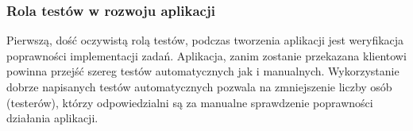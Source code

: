 \subsubsection{Rola testów w rozwoju aplikacji}
Pierwszą, dość oczywistą rolą testów, podczas tworzenia aplikacji jest weryfikacja poprawności implementacji zadań. Aplikacja, zanim zostanie przekazana klientowi powinna przejść szereg testów automatycznych jak i manualnych. Wykorzystanie dobrze napisanych testów automatycznych pozwala na zmniejszenie liczby osób (testerów), którzy odpowiedzialni są za manualne sprawdzenie poprawności działania aplikacji.